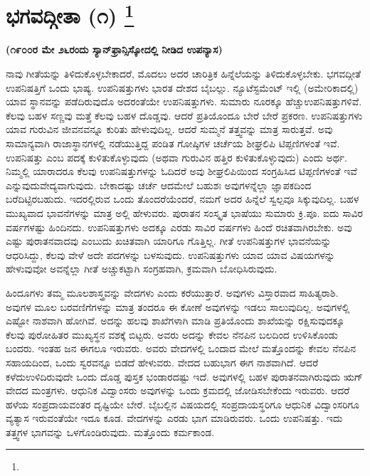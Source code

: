 
\chapter[ಭಗವದ್ಗೀತಾ (೧) ]{ಭಗವದ್ಗೀತಾ (೧) \protect\footnote{}}

\centerline{\textbf{(೧೯೦೦ರ ಮೇ ೨೬ರಂದು ಸ್ಯಾನ್​ಫ್ರಾನ್ಸಿಸ್ಕೋದಲ್ಲಿ ನೀಡಿದ ಉಪನ್ಯಾಸ)}}

ನಾವು ಗೀತೆಯನ್ನು ತಿಳಿದುಕೊಳ್ಳಬೇಕಾದರೆ, ಮೊದಲು ಅದರ ಚಾರಿತ್ರಿಕ ಹಿನ್ನೆಲೆಯನ್ನು ತಿಳಿದುಕೊಳ್ಳಬೇಕು. ಭಗವದ್ಗೀತೆ ಉಪನಿಷತ್ತಿಗೆ ಒಂದು ಭಾಷ್ಯ. ಉಪನಿಷತ್ತುಗಳು ಭಾರತ ದೇಶದ ಬೈಬಲ್ಲು. ನ್ಯೂಟೆಸ್ಟಮೆಂಟ್​ ಇಲ್ಲಿ (ಅಮೇರಿಕಾದಲ್ಲಿ) ಯಾವ ಸ್ಥಾನವನ್ನು ಪಡೆದಿರುವುದೊ ಅದರಂತೆಯೇ ಉಪನಿಷತ್ತುಗಳು. ಸುಮಾರು ನೂರಕ್ಕೂ ಹೆಚ್ಚು\break ಉಪನಿಷತ್ತುಗಳಿವೆ. ಕೆಲವು ಬಹಳ ಸಣ್ಣವು ಮತ್ತೆ ಕೆಲವು ಬಹಳ ದೊಡ್ಡವು. ಆದರೆ ಪ್ರತಿಯೊಂದೂ ಬೇರೆ ಬೇರೆ ಪ್ರಕರಣ. ಉಪನಿಷತ್ತುಗಳು ಯಾವ ಗುರುವಿನ ಜೀವನವನ್ನೂ ಕುರಿತು ಹೇಳುವುದಿಲ್ಲ. ಆದರೆ ಸುಮ್ಮನೆ ತತ್ತ್ವವನ್ನು ಮಾತ್ರ ಸಾರುತ್ತವೆ. ಅವು ಸಾಮಾನ್ಯವಾಗಿ ರಾಜಾಸ್ಥಾನಗಳಲ್ಲಿ ನಡೆಯುತ್ತಿದ್ದ ಪಂಡಿತ ಗೋಷ್ಠಿಗಳ ಚರ್ಚೆಯ ಶೀಘ್ರಲಿಪಿ ಟಿಪ್ಪಣಿಗಳಂತೆ ಇವೆ. ಉಪನಿಷತ್ತು ಎಂಬ ಪದಕ್ಕೆ ಕುಳಿತುಕೊಳ್ಳುವುದು (ಅಥವಾ ಗುರುವಿನ ಹತ್ತಿರ ಕುಳಿತುಕೊಳ್ಳುವುದು) ಎಂದು ಅರ್ಥ. ನಿಮ್ಮಲ್ಲಿ ಯಾರಾದರೂ ಕೆಲವು ಉಪನಿಷತ್ತುಗಳನ್ನು ಓದಿದರೆ ಅವು ಶೀಘ್ರಲಿಪಿಯಿಂದ ಸಂಗ್ರಹಿಸಿದ ಟಿಪ್ಪಣಿಗಳಂತೆ ಇವೆ ಎನ್ನುವುದು\break ವೇದ್ಯವಾಗುವುದು. ಬೇಕಾದಷ್ಟು ಚರ್ಚೆ ಆದಮೇಲೆ ಬಹುಶಃ ಅವುಗಳನ್ನೆಲ್ಲಾ ಜ್ಞಾಪಕದಿಂದ ಬರೆದಿಟ್ಟಿರಬಹುದು. ಇದರಲ್ಲಿರುವ ಒಂದು ತೊಂದರೆಯೆಂದರೆ, ನಮಗೆ ಅದರ ಹಿನ್ನೆಲೆ ಸ್ವಲ್ಪವೂ ಸಿಕ್ಕುವುದಿಲ್ಲ. ಬಹಳ ಮುಖ್ಯವಾದ ಭಾವನೆಗಳನ್ನು ಮಾತ್ರ ಅಲ್ಲಿ ಹೇಳುವರು. ಪುರಾತನ ಸಂಸ್ಕೃತ ಭಾಷೆಯು ಸುಮಾರು ಕ್ರಿ.ಪೂ. ಐದು ಸಾವಿರ ವರ್ಷಗಳಷ್ಟು ಹಿಂದಿನದು. ಉಪನಿಷತ್ತುಗಳು ಅದಕ್ಕೂ ಎರಡು ಸಾವಿರ ವರ್ಷಗಳು ಹಿಂದೆ ರಚಿತವಾಗಿರಬೇಕು. ಅವು ಎಷ್ಟು ಪುರಾತನವಾದವು ಎಂಬುದು ಖಚಿತವಾಗಿ ಯಾರಿಗೂ ಗೊತ್ತಿಲ್ಲ. ಗೀತೆ ಉಪನಿಷತ್ತುಗಳ ಭಾವನೆಯನ್ನು ಆಧರಿಸಿದ್ದು, ಕೆಲವು ವೇಳೆ ಅದೇ ಪದಗಳನ್ನು ಬಳಸುವುದು. ಉಪನಿಷತ್ತುಗಳು ಯಾವ ಯಾವ ವಿಷಯಗಳನ್ನು ಹೇಳುವುವೋ ಅವನ್ನೆಲ್ಲಾ ಗೀತೆ ಅಚ್ಚುಕಟ್ಟಾಗಿ ಸಂಗ್ರಹವಾಗಿ, ಕ್ರಮವಾಗಿ ಬೋಧಿಸಿರುವುದು.

ಹಿಂದೂಗಳು ತಮ್ಮ ಮೂಲಶಾಸ್ತ್ರವನ್ನು ವೇದಗಳು ಎಂದು ಕರೆಯುತ್ತಾರೆ. ಅವುಗಳು ವಿಸ್ತಾರವಾದ ಸಾಹಿತ್ಯರಾಶಿ. ಅವುಗಳ ಮೂಲ ಬರವಣಿಗೆಗಳನ್ನು ಮಾತ್ರ ತಂದರೂ ಈ ಕೋಣೆ ಅವುಗಳನ್ನು ಇಡಲು ಸಾಲುವುದಿಲ್ಲ. ಅವುಗಳಲ್ಲಿ ಎಷ್ಟೋ ನಾಶವಾಗಿ ಹೋಗಿವೆ. ಅದನ್ನು ಹಲವು ಶಾಖೆಗಳಾಗಿ ಮಾಡಿ ಪ್ರತಿಯೊಂದು ಶಾಖೆಯನ್ನು ರಕ್ಷಿಸುವುದಕ್ಕೂ ಕೆಲವು ಪುರೋಹಿತರ ಮುಖ್ಯಸ್ಥನ ವಶಕ್ಕೆ ಬಿಟ್ಟರು. ಅವರು ಅದನ್ನು ಕೇವಲ ನೆನಪಿನ ಬಲದಿಂದ ಉಳಿಸಿಕೊಂಡು ಬಂದರು. ಇಂತಹ ಜನ ಈಗಲೂ ಇರುವರು. ಅವರು ವೇದಗಳಲ್ಲಿ ಒಂದಾದ ಮೇಲೆ ಮತ್ತೊಂದನ್ನು ಕೇವಲ ನೆನಪಿನ ಸಹಾಯದಿಂದ, ಒಂದು ಸ್ವರವನ್ನೂ ಬಿಡದೆ ಹೇಳುವರು. ವೇದದ ಬಹುಭಾಗ ಈಗ ನಾಶವಾಗಿದೆ. ಆದರೆ ಕಳೆದು\break ಉಳಿದಿರುವುದೇ ಒಂದು ದೊಡ್ಡ ಪುಸ್ತಕ ಭಂಡಾರದಷ್ಟು ಇದೆ. ಅವುಗಳಲ್ಲಿ ಬಹಳ ಪುರಾತನವಾಗಿರುವುದು ಋಗ್​ವೇದದ ಮಂತ್ರಗಳು. ಆಧುನಿಕ ವಿದ್ವಾಂಸರು ಅವುಗಳನ್ನು ಒಂದು ಕ್ರಮದಲ್ಲಿ ಜೋಡಿಸಬೇಕೆಂದು ಇರುವರು. ಆದರೆ ಹಳೆಯ ಸಂಪ್ರದಾಯವಂತರ ದೃಷ್ಟಿಯೇ ಬೇರೆ. ಬೈಬಲ್ಲಿನ ವಿಷಯದಲ್ಲಿ ಸಂಪ್ರದಾಯಸ್ಥರಿಗೂ ಆಧುನಿಕ ವಿದ್ವಾಂಸರಿಗೂ ವ್ಯತ್ಯಾಸ ಇರುವಂತೆಯೇ ಇದೂ ಕೂಡ. ವೇದಗಳನ್ನು ಎರಡು ಭಾಗ ಮಾಡಿರುವರು. ಒಂದು ಉಪನಿಷತ್ತು. ಇದು ತತ್ತ್ವಗಳ ಭಾಗವನ್ನು ಒಳಗೊಂಡಿರುವುದು. ಮತ್ತೊಂದು ಕರ್ಮಕಾಂಡ.

